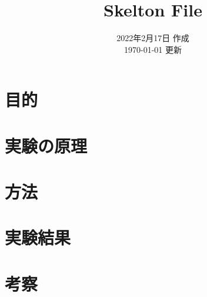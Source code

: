 \documentclass[uplatex,a4paper,10pt,dvipdfmx]{jsarticle}
\title{Skelton File}
\author{\myid  \myname}
\date {2022年2月17日 作成\\\today{} 更新}
\begin{document}
\maketitle

\section{目的}

\section{実験の原理}

\section{方法}

\section{実験結果}

\section{考察}


\begin{thebibliography}{9}
\end{thebibliography}
\end{document}
